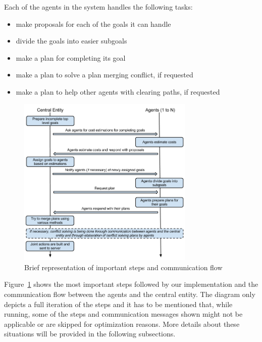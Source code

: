 Each of the agents in the system handles the following tasks:

\vspace{-12pt}
\begin{itemize}
\setlength{\itemsep}{0cm}
\item make proposals for each of the goals it can handle
\item divide the goals into easier subgoals
\item make a plan for completing its goal
\item make a plan to solve a plan merging conflict, if requested
\item make a plan to help other agents with clearing paths, if requested
\end{itemize}

\vspace{-0.3cm}
\begin{figure}[!htb]
\begin{center}
 \includegraphics[width=0.75\textwidth]{figures/communication_flow.png}
 \caption{Brief representation of important steps and communication flow}
 \label{fig:communication_flow}
\end{center}
\end{figure}

Figure~\ref{fig:communication_flow} shows the most important steps followed by our implementation and the
communication flow between the agents and the central entity. The diagram only depicts a full iteration of the
steps and it has to be mentioned that, while running, some of the steps and communication messages shown might
not be applicable or are skipped for optimization reasons. More details about these situations will be
provided in the following subsections.

